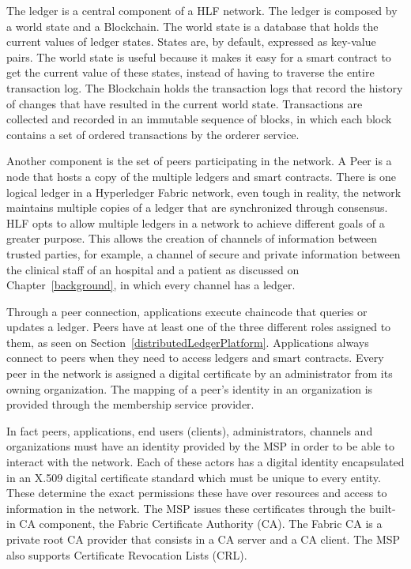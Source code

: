 The ledger is a central component of a HLF network. The ledger is composed by a
world state and a Blockchain. The world state is a database that holds the
current values of ledger states. States are, by default, expressed as key-value
pairs. The world state is useful because it makes it easy for a smart contract
to get the current value of these states, instead of having to traverse the
entire transaction log. The Blockchain holds the transaction logs that record
the history of changes that have resulted in the current world state.
Transactions are collected and recorded in an immutable sequence of blocks, in
which each block contains a set of ordered transactions by the orderer service.

Another component is the set of peers participating in the network. A Peer is a
node that hosts a copy of the multiple ledgers and smart contracts. There is
one logical ledger in a Hyperledger Fabric network, even tough in reality, the
network maintains multiple copies of a ledger that are synchronized through
consensus. HLF opts to allow multiple ledgers in a network to achieve different
goals of a greater purpose. This allows the creation of channels of information
between trusted parties, for example, a channel of secure and private
information between the clinical staff of an hospital and a patient as
discussed on Chapter~\ref{background}, in which every channel has a ledger.

Through a peer connection, applications execute chaincode that queries or
updates a ledger. Peers have at least one of the three different roles assigned
to them, as seen on Section~\ref{distributedLedgerPlatform}. Applications
always connect to peers when they need to access ledgers and smart contracts.
Every peer in the network is assigned a digital certificate by an administrator
from its owning organization. The mapping of a peer's identity in an
organization is provided through the membership service provider. 

In fact peers, applications, end users (clients), administrators, channels and
organizations must have an identity provided by the MSP in order to be able to
interact with the network. Each of these actors has a digital identity
encapsulated in an X.509 digital certificate standard which must be unique to
every entity. These determine the exact permissions these have over resources
and access to information in the network. The MSP issues these certificates
through the built-in CA component, the Fabric Certificate Authority (CA). The
Fabric CA is a private root CA provider that consists in a CA server and a CA
client. The MSP also supports Certificate Revocation Lists (CRL).


